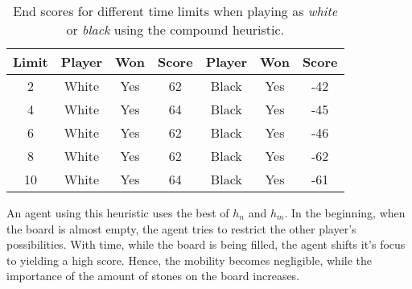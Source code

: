 \begin{table}[!ht]
\centering
\begin{tabular}{ |c||c|c|c||c|c|c| } 
 \hline
 Limit & Player & Won & Score & Player & Won & Score \\ \hline \hline
  2 & White & Yes & 62 & Black & Yes & -42 \\ 
  4 & White & Yes & 64 & Black & Yes & -45 \\  
  6 & White & Yes & 62 & Black & Yes & -46 \\  
  8 & White & Yes & 62 & Black & Yes & -62 \\   
 10 & White & Yes & 64 & Black & Yes & -61 \\ 
 \hline
\end{tabular}
\caption{\label{tab:comp} End scores for different time limits when playing as \textit{white} or \textit{black} using the compound heuristic.}
\end{table}

An agent using this heuristic uses the best of $h_{n}$ and $h_{m}$.
In the beginning, when the board is almost empty, the agent tries to restrict the other player's possibilities.
With time, while the board is being filled, the agent shifts it's focus to yielding a high score.
Hence, the mobility becomes negligible, while the importance of the amount of stones on the board increases.
